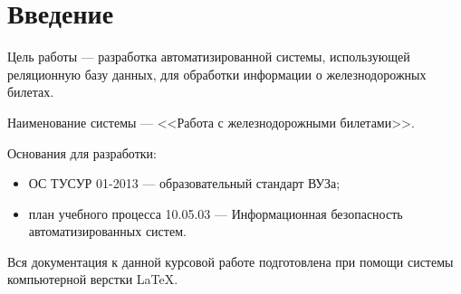 \section{Введение}

Цель работы --- разработка автоматизированной системы, использующей реляционную базу данных, для обработки информации о железнодорожных билетах.\par 

Наименование системы --- <<Работа с железнодорожными билетами>>.\par 

Основания для разработки:
\begin{itemize}
\item ОС ТУСУР 01-2013 --- образовательный стандарт ВУЗа; 
\item план учебного процесса 10.05.03 --- Информационная безопасность автоматизированных систем.
\end{itemize}

Вся документация к данной курсовой работе подготовлена при помощи системы компьютерной верстки \LaTeX .\par 

\clearpage